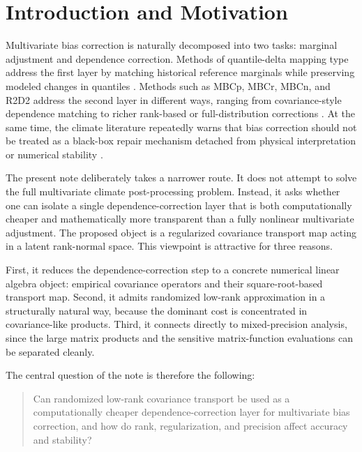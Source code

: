 \graphicspath{{../../figures/}{../../../figures/}}

\section{Introduction and Motivation}

Multivariate bias correction is naturally decomposed into two tasks: marginal adjustment and dependence correction. Methods of quantile-delta mapping type address the first layer by matching historical reference marginals while preserving modeled changes in quantiles \autocite{cannon2015qdm}. Methods such as MBCp, MBCr, MBCn, and R2D2 address the second layer in different ways, ranging from covariance-style dependence matching to richer rank-based or full-distribution corrections \autocite{cannon2016mbc,cannon2018mbcn,vrac2018r2d2}. At the same time, the climate literature repeatedly warns that bias correction should not be treated as a black-box repair mechanism detached from physical interpretation or numerical stability \autocite{maraun2016biasreview}.

The present note deliberately takes a narrower route. It does not attempt to solve the full multivariate climate post-processing problem. Instead, it asks whether one can isolate a single dependence-correction layer that is both computationally cheaper and mathematically more transparent than a fully nonlinear multivariate adjustment. The proposed object is a regularized covariance transport map acting in a latent rank-normal space. This viewpoint is attractive for three reasons.

First, it reduces the dependence-correction step to a concrete numerical linear algebra object: empirical covariance operators and their square-root-based transport map. Second, it admits randomized low-rank approximation in a structurally natural way, because the dominant cost is concentrated in covariance-like products. Third, it connects directly to mixed-precision analysis, since the large matrix products and the sensitive matrix-function evaluations can be separated cleanly.

The central question of the note is therefore the following:
\begin{quote}
	Can randomized low-rank covariance transport be used as a computationally cheaper dependence-correction layer for multivariate bias correction, and how do rank, regularization, and precision affect accuracy and stability?
\end{quote}

